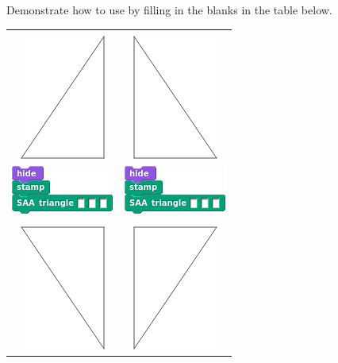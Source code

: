 \documentclass[noauthor,nooutcomes,12pt,hints,handout]{ximera}
\begin{document}
\begin{question}%
  Demonstrate how to use  by filling in the
  blanks in the table below.
  \begin{center}
    \begin{tabular}{|c||c|}\hline
      &  \\
      \includegraphics{EgStageII.png} & \includegraphics{EgStageI.png} \\
      \includegraphics{SAAstampBlank.png} & \includegraphics{SAAstampBlank.png} \\
      \hline\hline
      &  \\
      \includegraphics{EgStageIII.png} & \includegraphics{EgStageIV.png} \\

\end{tabular}
\end{center}
\end{question}
\end{document}
